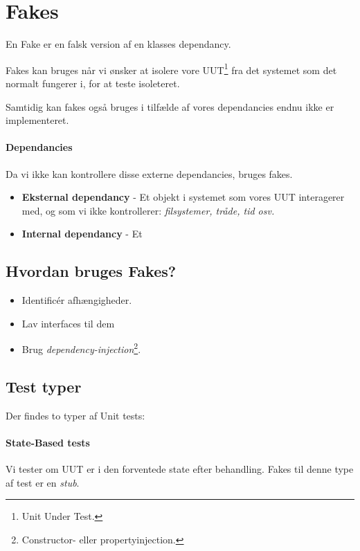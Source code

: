 \section{Fakes}

En Fake er en falsk version af en klasses dependancy.

Fakes kan bruges når vi ønsker at isolere vore UUT\footnote{Unit Under Test.} fra det systemet som det normalt fungerer i, for at teste isoleteret.

Samtidig kan fakes også bruges i tilfælde af vores dependancies endnu ikke er implementeret.

\paragraph{Dependancies} Da vi ikke kan kontrollere disse externe dependancies, bruges fakes.

\begin{itemize}
	\item \textbf{Eksternal dependancy} - Et objekt i systemet som vores UUT interagerer med, og som vi ikke kontrollerer: \textit{filsystemer, tråde, tid osv.}
	\item \textbf{Internal dependancy} - Et 
\end{itemize}

\subsection{Hvordan bruges Fakes?}

\begin{itemize}
	\item Identificér afhængigheder.
	\item Lav interfaces til dem
	\item Brug \textit{dependency-injection}\footnote{Constructor- eller propertyinjection.}.
\end{itemize}

\subsection{Test typer}
Der findes to typer af Unit tests:

\paragraph{State-Based tests} Vi tester om UUT er i den forventede state efter behandling. Fakes til denne type af test er en \textit{stub}. \\

